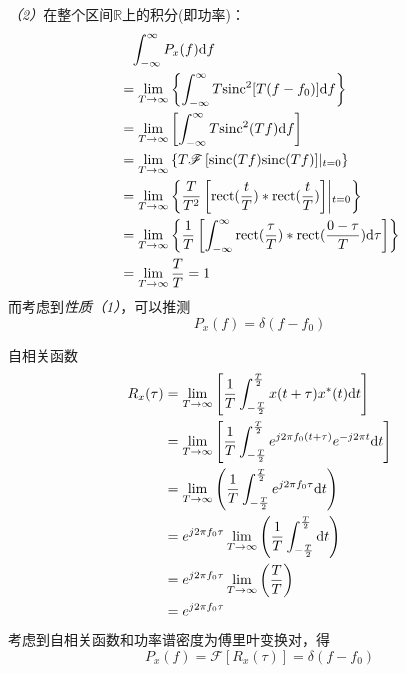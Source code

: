     \emph{（2）}在整个区间$\mathbb{R}$上的积分(即功率)：
    \begin{equation*}
        \begin{split}
            &\phantom{=}\int_{-\infty}^{\infty}P_x(f)\text{\upshape d} f\\
            &=\lim_{T\to\infty}\left\{\int_{-\infty}^{\infty}T\text{sinc}^2[T(f-f_0)]\text{\upshape d} f\right\}\\
            &=\lim_{T\to\infty}\left[\int_{-\infty}^{\infty}T\text{sinc}^2(Tf)\text{\upshape d} f\right]\\
            &=\lim_{T\to\infty}\left\{T\mathscr{F}\left[\text{sinc}(Tf)\text{sinc}(Tf)\right]\middle\vert_{t=0}\right\}\\
            &=\lim_{T\to\infty}\left\{\frac{T}{T^2}\left[\text{rect}(\frac{t}{T})*\text{rect}(\frac{t}{T})\right]\middle\vert_{t=0}\right\}\\
            &=\lim_{T\to\infty}\left\{\frac{1}{T}\left[\int_{-\infty}^{\infty}\text{rect}(\frac{\tau}{T})*\text{rect}(\frac{0-\tau}{T})\text{\upshape d}\tau\right]\right\}\\
            &=\lim_{T\to\infty}\frac{T}{T}=1
        \end{split}
    \end{equation*}
    而考虑到\emph{性质（1）}，可以推测
    \begin{equation}
        P_x(f)=\delta(f-f_0) 
    \end{equation}

    自相关函数
    \begin{equation}
        \begin{split}
            R_x(\tau)   &=\lim_{T\to\infty}\left[\frac{1}{T}\int_{-\frac{T}{2}}^{\frac{T}{2}}x(t+\tau)x^*(t)\text{\upshape d} t\right]\\
                        &=\lim_{T\to\infty}\left[\frac{1}{T}\int_{-\frac{T}{2}}^{\frac{T}{2}}e^{j2\pi f_0(t+\tau)}e^{-j2\pi t}\text{\upshape d} t\right]\\
                        &=\lim_{T\to\infty}\left(\frac{1}{T}\int_{-\frac{T}{2}}^{\frac{T}{2}}e^{j2\pi f_0\tau}\text{\upshape d} t\right)\\
                        &=e^{j2\pi f_0\tau}\lim_{T\to\infty}\left(\frac{1}{T}\int_{-\frac{T}{2}}^{\frac{T}{2}}\text{\upshape d} t\right)\\
                        &=e^{j2\pi f_0\tau}\lim_{T\to\infty}\left(\frac{T}{T}\right)\\
                        &=e^{j2\pi f_0\tau}
        \end{split}
    \end{equation}
    考虑到自相关函数和功率谱密度为傅里叶变换对，得
    \begin{equation}
        P_x(f)=\mathscr{F}[R_x(\tau)]=\delta(f-f_0)
    \end{equation}

